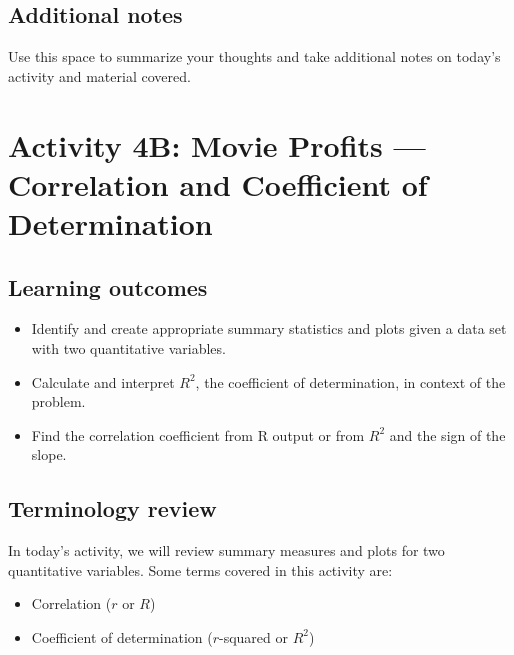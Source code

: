 \documentclass[
]{report}
\begin{document}
\hypertarget{additional-notes-5}{%
\subsection{Additional notes}\label{additional-notes-5}}

Use this space to summarize your thoughts and take additional notes on today's activity and material covered.

\newpage

\hypertarget{activity-4b-movie-profits-correlation-and-coefficient-of-determination}{%
\section{Activity 4B: Movie Profits --- Correlation and Coefficient of Determination}\label{activity-4b-movie-profits-correlation-and-coefficient-of-determination}}


\hypertarget{learning-outcomes-7}{%
\subsection{Learning outcomes}\label{learning-outcomes-7}}

\begin{itemize}
\item
  Identify and create appropriate summary statistics and plots
  given a data set with two quantitative variables.
\item
  Calculate and interpret \(R^2\), the coefficient of determination, in context of the problem.
\item
  Find the correlation coefficient from R output or from \(R^2\) and the sign of the slope.
\end{itemize}

\hypertarget{terminology-review-7}{%
\subsection{Terminology review}\label{terminology-review-7}}

In today's activity, we will review summary measures and plots for two quantitative variables. Some terms covered in this activity are:

\begin{itemize}
\item
  Correlation (\(r\) or \(R\))
\item
  Coefficient of determination (\(r\)-squared or \(R^2\))
\end{itemize}
\end{document}
